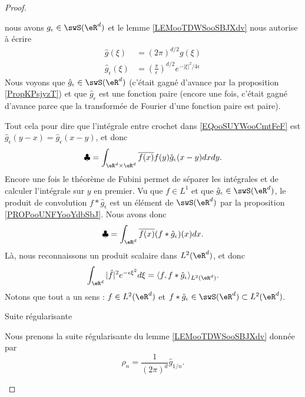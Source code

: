 \begin{proof}
\begin{subproof}
        nous avons \( g_{\epsilon}\in \swS(\eR^d)\) et le lemme \ref{LEMooTDWSooSBJXdv} nous autorise à écrire
        \begin{subequations}
            \begin{align}
                \hat g(\xi)&=(2\pi)^{d/2}g(\xi)\\
                \hat g_{\epsilon}(\xi)&=\left( \frac{ \pi }{ \epsilon } \right)^{d/2} e^{-| \xi |^2/4\epsilon} 
            \end{align}
        \end{subequations}
        Nous voyons que \( \hat g_{\epsilon}\in\swS(\eR^d)\) (c'était gagné d'avance par la proposition \ref{PropKPsjyzT}) et que \( \hat g_{\epsilon}\) est une fonction paire (encore une fois, c'était gagné d'avance parce que la transformée de Fourier d'une fonction paire est paire).

        Tout cela pour dire que l'intégrale entre crochet dans \eqref{EQooSUYWooCmtFeF} est \( \hat g_{\epsilon}(y-x)=\hat g_{\epsilon}(x-y)\), et donc
        \begin{equation}
            \clubsuit=\int_{\eR^d\times \eR^d} \overline{ f(x) }f(y)  \hat g_{\epsilon}(x-y)  dxdy.
        \end{equation}
        Encore une fois le théorème de Fubini permet de séparer les intégrales et de calculer l'intégrale sur \( y\) en premier. Vu que \( f\in L^1\) et que \( \hat g_{\epsilon}\in \swS(\eR^d)\), le produit de convolution \( f*\hat g_{\epsilon}\) est un élément de \( \swS(\eR^d)\) par la proposition \ref{PROPooUNFYooYdbSbJ}.
        Nous avons donc
        \begin{equation}
            \clubsuit=\int_{\eR^d}\overline{ f(x) }(f* \hat g_{\epsilon})(x)dx.
        \end{equation}
        Là, nous reconnaissons un produit scalaire dans \( L^2(\eR^d)\), et donc
        \begin{equation}        \label{EQooWIHNooHutHlS}
            \int_{\eR^d}| \hat f |^2 e^{-\epsilon\xi^2}d\xi=\langle f, f*\hat g_{\epsilon}\rangle_{L^2(\eR^d)}.
        \end{equation}
        Notons que tout a un sens : \( f\in L^2(\eR^d)\) et \( f*\hat g_{\epsilon}\in\swS(\eR^d)\subset L^2(\eR^d)\).

    \item[Suite régularisante]

        Nous prenons la suite régularisante du lemme \ref{LEMooTDWSooSBJXdv} donnée par
        \begin{equation}
            \rho_n=\frac{1}{ (2\pi)^d }\hat g_{1/n}.
        \end{equation}


\end{subproof}
\end{proof}
